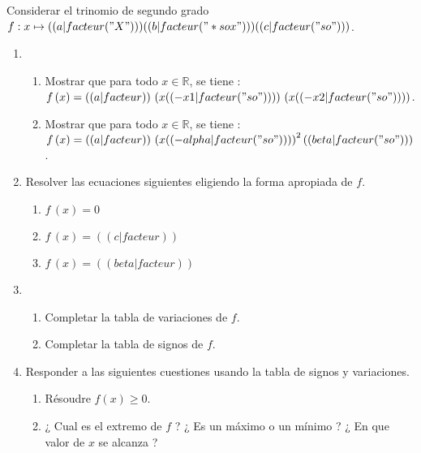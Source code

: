 \exercice
Considerar el trinomio de segundo grado $f: x\mapsto (( a|facteur("X") )) (( b|facteur("*sox") )) (( c|facteur("so") ))$.

\begin{enumerate}
\item
\begin{enumerate}
    \item Mostrar que para todo $x\in\mathbb{R}$, se tiene : $f\,(x)=(( a|facteur )) \,\left( x (( -x1|facteur("so") )) \right) \, \left( x (( -x2|facteur("so") )) \right) $.
    \item Mostrar que para todo $x\in\mathbb{R}$, se tiene : $f\,(x)=(( a|facteur )) \,\left( x (( -alpha|facteur("so") )) \right)^2 (( beta|facteur("so") ))$.
\end{enumerate}
\item Resolver las ecuaciones siguientes eligiendo la forma apropiada de $f$.
\begin{enumerate}
\item $f\,(x)=0$
\item $f\,(x)=(( c|facteur ))$
\item $f\,(x)=(( beta|facteur ))$
\end{enumerate}
\item
\begin{enumerate}
\item Completar la tabla de variaciones de $f$.
\item Completar la tabla de signos de $f$.
\end{enumerate}
\item Responder a las siguientes cuestiones usando la tabla de signos y variaciones.
\begin{enumerate}
\item Résoudre $f(x)\geqslant0$.
\item ¿ Cual es el extremo de $f$ ? ¿ Es un máximo o un mínimo ? ¿ En que valor de $x$ se alcanza ?
\end{enumerate}
\end{enumerate}
